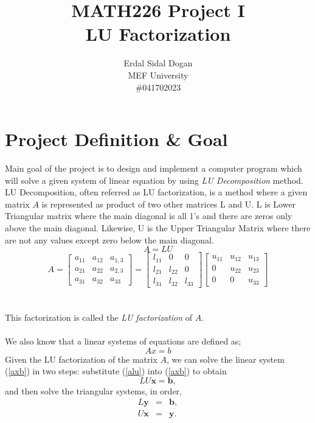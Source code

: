 \documentclass{article}
\title{MATH226 Project I \\ LU Factorization}
\author{Erdal Sidal Dogan \\ MEF University \\ \#041702023}
\newcommand{\bx}{{\mathbf x}}
\newcommand{\by}{{\mathbf y}}
\newcommand{\bb}{{\mathbf b}}
\begin{document}
	\maketitle
	\section{Project Definition \& Goal}
	Main goal of the project is to design and implement a computer program which will solve a given system of linear equation by using \textit{LU Decomposition} method. LU Decomposition, often referred as LU factorization, is a method where a given matrix $A$ is represented as product of two other matrices L and U. L is Lower Triangular matrix where the main diagonal is all 1's and there are zeros only above the main diagonal. Likewise, U is the Upper Triangular Matrix where there are not any values except zero below the main diagonal. 
	\begin{equation} \label{alu}
 	  A = LU 
 \end{equation} 
\begin{equation}
A=\left[\begin{array}{ccccc} 
a_{11} & a_{12} & a_{1,3} \\
a_{21} & a_{22} & a_{2,3} \\
a_{31} & a_{32} & a_{33} 
\end{array}\right] = \left[\begin{array}{ccccc} 
l_{11} & 0 & 0 \\
l_{21} & l_{22} & 0 \\
l_{31} & l_{32} & l_{33} 
\end{array}\right]\left[\begin{array}{ccccc} 
u_{11} & u_{12} & u_{13} \\
0 & u_{22} & u_{23} \\
0 & 0 & u_{33} 
\end{array}\right] 
\end{equation}\\\\
This factorization is called the \emph{LU factorization} of $A$.\\ \\We also know that a linear systems of equations are defined as;
 	\begin{equation} \label{axb}
 	  Ax = b 
 \end{equation}
Given the LU factorization of the matrix $A$, we can solve the linear system 
(\ref{axb}) in two steps: substitute (\ref{alu}) into (\ref{axb})
to obtain
\[
LU{\bx}={\bb},
\]
and then solve the triangular systems, in order,
\begin{eqnarray}
\label{fsubst}
L{\by}&=&{\bb}, \\
\label{bsubst}
U{\bx}&=&{\by}.
\end{eqnarray}
\end{document}
